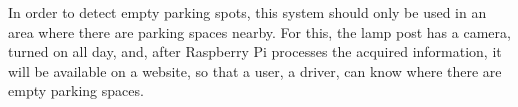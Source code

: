 In order to detect empty parking spots, this system should only be used in an area where there are parking spaces nearby. For this, the lamp post has a camera, turned on all day, and, after Raspberry Pi processes the acquired information, it will be available on a website, so that a user, a driver, can know where there are empty parking spaces.

